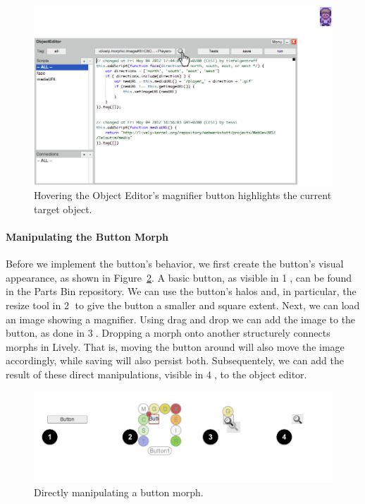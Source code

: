 \begin{figure}[h]
    \centering
    \includegraphics[width=\textwidth]{figures/3_motivation/2_magnifierBehavior.png}
    \caption{Hovering the Object Editor's magnifier button highlights the current target object.}
    \label{fig:MagnifierBehavior}
\end{figure}

\paragraph{Manipulating the Button Morph}
Before we implement the button's behavior, we first create the button's visual appearance, as shown in Figure~\ref{fig:ButtonBuilding}.
A basic button, as visible in \textcircled{1}, can be found in the Parts Bin repository.
We can use the button's halos and, in particular, the resize tool in \textcircled{2} to give the button a smaller and square extent.
Next, we can load an image showing a magnifier.
Using drag and drop we can add the image to the button, as done in \textcircled{3}.
Dropping a morph onto another structurely connects morphs in Lively.
That is, moving the button around will also move the image accordingly, while saving will also persist both.
Subsequentely, we can add the result of these direct manipulations, visible in \textcircled{4}, to the object editor.

\begin{figure}[h]
    \centering
    \includegraphics[width=\textwidth]{figures/3_motivation/3_buildingTheButton.png}
    \caption{Directly manipulating a button morph.}
    \label{fig:ButtonBuilding}
\end{figure}

